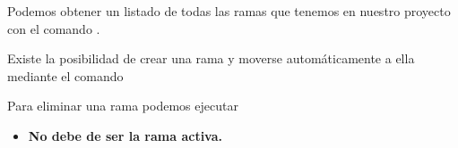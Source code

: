 Podemos obtener un listado de todas las ramas que tenemos en nuestro proyecto con el comando .

Existe la posibilidad de crear una rama y moverse automáticamente a ella mediante el comando \linebreak {}

Para eliminar una rama podemos ejecutar 
\begin{itemize}
	\item \textbf{No debe de ser la rama activa.}
\end{itemize}